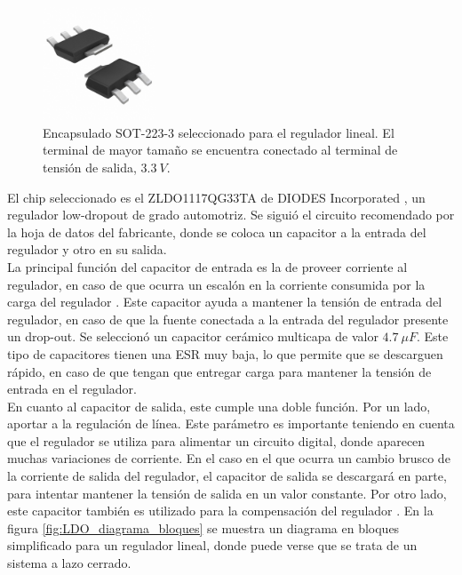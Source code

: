 \begin{figure}[H]
    \centering
    \includegraphics[width=0.3\textwidth]{img/sot_223_3.png}
    \caption{Encapsulado SOT-223-3 seleccionado para el regulador lineal. El terminal de mayor tamaño se encuentra conectado al terminal de tensión de salida, $3.3 \ V$.}
    \label{fig:sot_223_3}
\end{figure}

El chip seleccionado es el ZLDO1117QG33TA de DIODES Incorporated \cite{ZLDO1117QG33TA}, un regulador low-dropout de grado automotriz. Se siguió el circuito recomendado por la hoja de datos del fabricante, donde se coloca un capacitor a la entrada del regulador y otro en su salida.\\

La principal función del capacitor de entrada es la de proveer corriente al regulador, en caso de que ocurra un escalón en la corriente consumida por la carga del regulador \cite{TOSHIBALDO}. Este capacitor ayuda a mantener la tensión de entrada del regulador, en caso de que la fuente conectada a la entrada del regulador presente un drop-out. Se seleccionó un capacitor cerámico multicapa de valor $4.7 \ \mu F$. Este tipo de capacitores tienen una ESR muy baja, lo que permite que se descarguen rápido, en caso de que tengan que entregar carga para mantener la tensión de entrada en el regulador.\\

En cuanto al capacitor de salida, este cumple una doble función. Por un lado, aportar a la regulación de línea. Este parámetro es importante teniendo en cuenta que el regulador se utiliza para alimentar un circuito digital, donde aparecen muchas variaciones de corriente. En el caso en el que ocurra un cambio brusco de la corriente de salida del regulador, el capacitor de salida se descargará en parte, para intentar mantener la tensión de salida en un valor constante. Por otro lado, este capacitor también es utilizado para la compensación del regulador \cite{TOSHIBALDO}. En la figura \ref{fig:LDO_diagrama_bloques} se muestra un diagrama en bloques simplificado para un regulador lineal, donde puede verse que se trata de un sistema a lazo cerrado.

